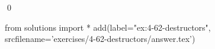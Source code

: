 
\begin{ex}
  \label{ex:4-62-destructors}
  
  \qed
\end{ex}
\begin{python0}
from solutions import *
add(label="ex:4-62-destructors",
    srcfilename='exercises/4-62-destructors/answer.tex')
\end{python0}

